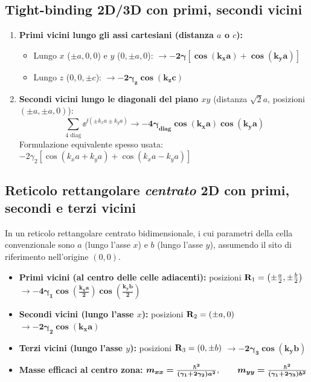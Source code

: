 \subsection{Tight-binding 2D/3D con primi, secondi vicini}
\begin{enumerate}
    \item \textbf{Primi vicini lungo gli assi cartesiani (distanza $a$ o $c$):}
    \begin{itemize}
        \item Lungo $x$ ($\pm a,0,0$) e $y$ ($0,\pm a,0$): $\rightarrow \bm{-2\gamma[\cos(k_x a)+\cos(k_y a)]}$
        \item Lungo $z$ ($0,0,\pm c$): $\rightarrow \bm{-2\gamma_z\cos(k_z c)}$
    \end{itemize}
    \item \textbf{Secondi vicini lungo le diagonali del piano $xy$} (distanza $\sqrt2 a$, posizioni $(\pm a,\pm a,0)$): 
    \[ \sum_{\text{4 diag}}\ee^{\ii(\pm k_xa\pm k_ya)} \longrightarrow \bm{-4\gamma_{diag}\cos(k_xa)\cos(k_ya)} \]
    Formulazione equivalente spesso usata: $-2\gamma_2\left[\cos(k_xa+k_ya)+\cos(k_xa-k_ya)\right]$

\end{enumerate}

\subsection{Reticolo rettangolare \textit{centrato} 2D con primi, secondi e terzi vicini}
In un reticolo rettangolare centrato bidimensionale, i cui parametri della cella convenzionale sono $a$ (lungo l'asse $x$) e $b$ (lungo l'asse $y$), assumendo il sito di riferimento nell'origine $(0,0)$.
\begin{itemize}
    \item \textbf{Primi vicini (al centro delle celle adiacenti):} posizioni $\mathbf{R}_1 = \left(\pm\frac{a}{2}, \pm\frac{b}{2}\right)$ 
     $\rightarrow 
 \bm{-4\gamma_1\cos\!\left(\frac{k_x a}{2}\right)\cos\!\left(\frac{k_y b}{2}\right)} $
    \item \textbf{Secondi vicini (lungo l'asse $x$):} posizioni $\mathbf{R}_2 = (\pm a, 0)$  $\rightarrow \bm{-2\gamma_2\cos(k_x a)} $
    \item \textbf{Terzi vicini (lungo l'asse $y$):} posizioni $\mathbf{R}_3 = (0, \pm b)$ $ \rightarrow \bm{-2\gamma_3\cos(k_y b)} $
    \item \textbf{Masse efficaci al centro zona:}  $\bm{m_{xx} = \frac{\hbar^2}{(\gamma_1+2\gamma_2)a^2}}, \qquad \bm{m_{yy} = \frac{\hbar^2}{(\gamma_1+2\gamma_3)b^2}}$
\end{itemize}

